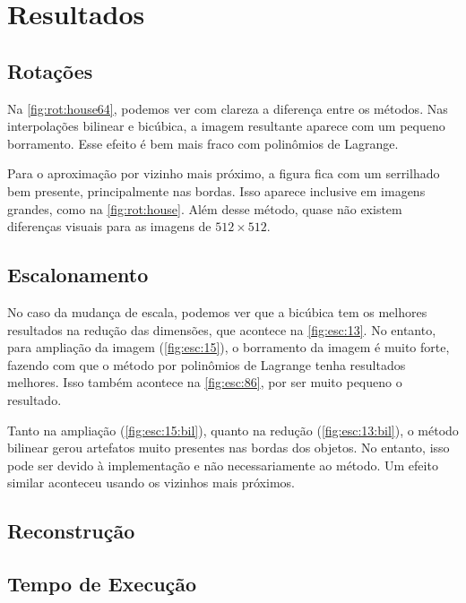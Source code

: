 \section{Resultados} \label{sec:resultados}

\subsection{Rotações}

    

    Na \cref{fig:rot:house64}, podemos ver com clareza a diferença entre os métodos. Nas interpolações bilinear e bicúbica, a imagem resultante aparece com um pequeno borramento. Esse efeito é bem mais fraco com polinômios de Lagrange.

    Para o aproximação por vizinho mais próximo, a figura fica com um serrilhado bem presente, principalmente nas bordas. Isso aparece inclusive em imagens grandes, como na \cref{fig:rot:house}. Além desse método, quase não existem diferenças visuais para as imagens de $512 \times 512$.

    

    

\subsection{Escalonamento}

    

    

    No caso da mudança de escala, podemos ver que a bicúbica tem os melhores resultados na redução das dimensões, que acontece na \cref{fig:esc:13}. No entanto, para ampliação da imagem (\cref{fig:esc:15}), o borramento da imagem é muito forte, fazendo com que o método por polinômios de Lagrange tenha resultados melhores. Isso também acontece na \cref{fig:esc:86}, por ser muito pequeno o resultado.

    Tanto na ampliação (\ref{fig:esc:15:bil}), quanto na redução (\ref{fig:esc:13:bil}), o método bilinear gerou artefatos muito presentes nas bordas dos objetos. No entanto, isso pode ser devido à implementação e não necessariamente ao método. Um efeito similar aconteceu usando os vizinhos mais próximos.

    

\subsection{Reconstrução}

\subsection{Tempo de Execução}
